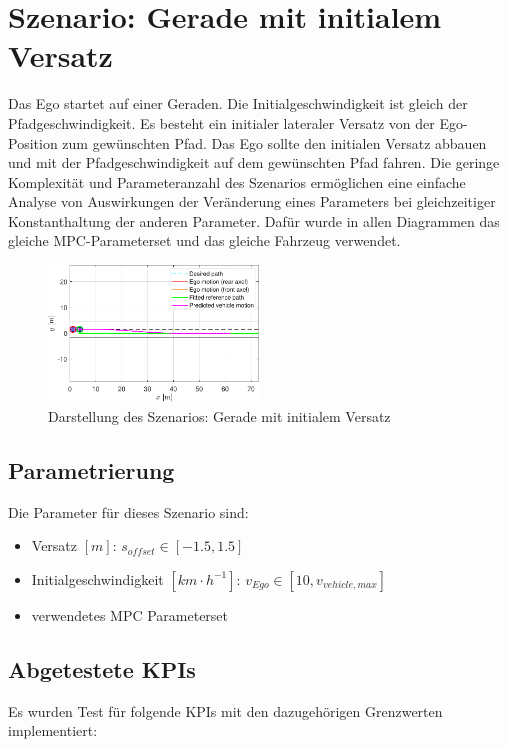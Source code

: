 \section{Szenario: Gerade mit initialem Versatz} \label{sec:straight_offset}
Das Ego startet auf einer Geraden. Die Initialgeschwindigkeit ist gleich der Pfadgeschwindigkeit. Es besteht ein initialer lateraler Versatz von der Ego-Position zum gewünschten Pfad. Das Ego sollte den initialen Versatz abbauen und mit der Pfadgeschwindigkeit auf dem gewünschten Pfad fahren. Die geringe Komplexität und Parameteranzahl des Szenarios ermöglichen eine einfache Analyse von Auswirkungen der Veränderung eines Parameters bei gleichzeitiger Konstanthaltung der anderen Parameter. Dafür wurde in allen Diagrammen das gleiche MPC-Parameterset und das gleiche Fahrzeug verwendet.
\begin{figure}[ht]
    \centering
    \includegraphics[width=0.5\textwidth]{figures/3_Implementierung/Straight_Offset/test_straight_depiction.pdf}
    \caption{Darstellung des Szenarios: Gerade mit initialem Versatz}
    \label{fig:test_straight_depiction}
\end{figure}

\subsection{Parametrierung}
Die Parameter für dieses Szenario sind:
\begin{itemize}
    \item Versatz $[m]$: $s_{offset} \in [-1.5,1.5]$ 
    \item Initialgeschwindigkeit $[km\cdot h^{-1}]$: $v_{Ego} \in [10,v_{vehicle,max}]$
    \item verwendetes MPC Parameterset 
\end{itemize}

\subsection{Abgetestete KPIs}
Es wurden Test für folgende KPIs mit den dazugehörigen Grenzwerten implementiert:

